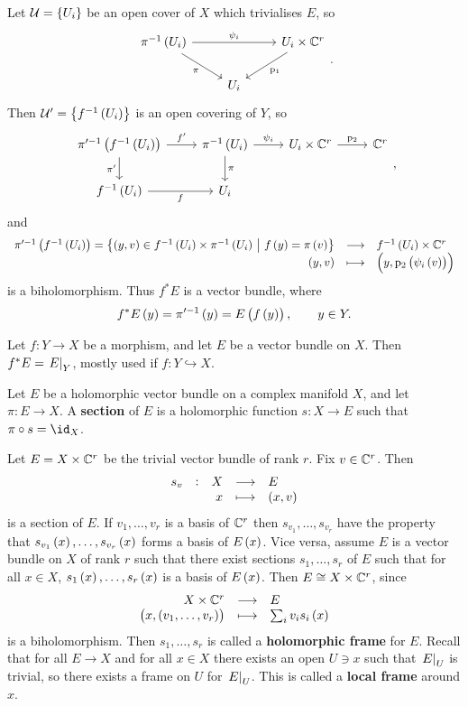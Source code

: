 Let $ \UUU = \cbr{U_i} $ be an open cover of $ X $ which trivialises $ E $, so
$$
\begin{tikzcd}
\pi^{-1}\br{U_i} \arrow{rr}{\psi_i} \arrow{dr}[swap]{\pi} & & U_i \times \CC^r \arrow{dl}{\p_1} \\
& U_i &
\end{tikzcd}.
$$
Then $ \UUU' = \cbr{f^{-1}\br{U_i}} $ is an open covering of $ Y $, so
$$
\begin{tikzcd}
\pi'^{-1}\br{f^{-1}\br{U_i}} \arrow{r}{f'} \arrow{d}[swap]{\pi'} & \pi^{-1}\br{U_i} \arrow{r}{\psi_i} \arrow{d}{\pi} & U_i \times \CC^r \arrow{r}{\p_2} & \CC^r \\
f^{-1}\br{U_i} \arrow{r}[swap]{f} & U_i & &
\end{tikzcd},
$$
and
$$ \function{\pi'^{-1}\br{f^{-1}\br{U_i}} = \cbr{\br{y, v} \in f^{-1}\br{U_i} \times \pi^{-1}\br{U_i} \st f\br{y} = \pi\br{v}}}{f^{-1}\br{U_i} \times \CC^r}{\br{y, v}}{\br{y, \p_2\br{\psi_i\br{v}}}} $$
is a biholomorphism. Thus $ f^*E $ is a vector bundle, where
$$ f^*E\br{y} = \pi'^{-1}\br{y} = E\br{f\br{y}}, \qquad y \in Y. $$

\begin{notation}
Let $ f : Y \to X $ be a morphism, and let $ E $ be a vector bundle on $ X $. Then $ f^*E = \left. E \right|_Y $, mostly used if $ f : Y \hookrightarrow X $.
\end{notation}

\begin{definition}
Let $ E $ be a holomorphic vector bundle on a complex manifold $ X $, and let $ \pi : E \to X $. A \textbf{section} of $ E $ is a holomorphic function $ s : X \to E $ such that $ \pi \circ s = \id_X $.
\end{definition}

\begin{example}
Let $ E = X \times \mathbb{C}^r $ be the trivial vector bundle of rank $ r $. Fix $ v \in \mathbb{C}^r $. Then
$$ \function[s_v]{X}{E}{x}{\br{x, v}} $$
is a section of $ E $. If $ v_1, \dots, v_r $ is a basis of $ \mathbb{C}^r $ then $ s_{v_1}, \dots, s_{v_r} $ have the property that $ s_{v_1}\br{x}, \dots, s_{v_r}\br{x} $ forms a basis of $ E\br{x} $. Vice versa, assume $ E $ is a vector bundle on $ X $ of rank $ r $ such that there exist sections $ s_1, \dots, s_r $ of $ E $ such that for all $ x \in X $, $ s_1\br{x}, \dots, s_r\br{x} $ is a basis of $ E\br{x} $. Then $ E \cong X \times \mathbb{C}^r $, since
$$ \function{X \times \CC^r}{E}{\br{x, \br{v_1, \dots, v_r}}}{\sum_i v_is_i\br{x}} $$
is a biholomorphism. Then $ s_1, \dots, s_r $ is called a \textbf{holomorphic frame} for $ E $. Recall that for all $ E \to X $ and for all $ x \in X $ there exists an open $ U \ni x $ such that $ \left. E \right|_U $ is trivial, so there exists a frame on $ U $ for $ \left. E \right|_U $. This is called a \textbf{local frame} around $ x $.
\end{example}

